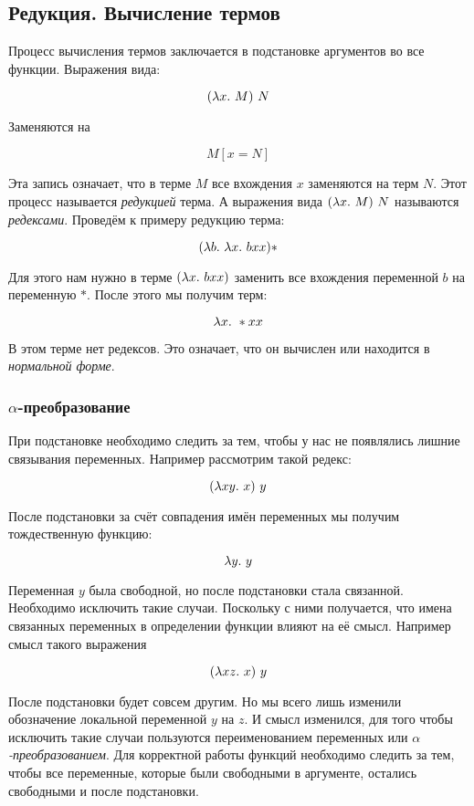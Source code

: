 \subsection{Редукция. Вычисление термов}

Процесс вычисления термов заключается в подстановке аргументов
во все функции. Выражения вида:

\[ (\lambda x .\  M)\ N \]

Заменяются на 

\[ M[x = N] \]

Эта запись означает, что в терме $M$ все вхождения $x$ 
заменяются на терм $N$. Этот процесс называется \emph{редукцией}
терма. А выражения вида $(\lambda x .\  M)\ N$ называются
\emph{редексами}. Проведём к примеру редукцию терма:

\[  (\lambda b.\  \lambda x.\  b xx) * \]

Для этого нам нужно в терме $(\lambda x.\  b xx)$ заменить все 
вхождения переменной $b$ на переменную $*$. После этого мы получим
терм:

\[ \lambda x .\  * xx \]

В этом терме нет редексов. Это означает, что он вычислен
или находится в \emph{нормальной форме}.

\subsubsection{$\alpha$-преобразование}

При подстановке необходимо следить за тем, чтобы у нас 
не появлялись лишние связывания переменных. Например 
рассмотрим такой редекс:

\[ (\lambda x y .\  x)\ y \]

После подстановки за счёт совпадения имён переменных 
мы получим тождественную функцию:

\[ \lambda y .\  y \]

Переменная $y$ была свободной, но после подстановки 
стала связанной. Необходимо исключить такие случаи.
Поскольку с ними получается, что имена связанных переменных 
в определении функции влияют на её смысл. Например смысл
такого выражения

\[ (\lambda x z .\  x)\ y \]

После подстановки будет совсем другим. Но мы всего лишь
изменили обозначение локальной переменной $y$ на $z$.
И смысл изменился, для того чтобы исключить такие случаи
пользуются переименованием переменных или 
\emph{$\alpha$-преобразованием}. Для корректной работы
функций необходимо следить за тем, чтобы все переменные,
которые были свободными в аргументе, остались свободными
и после подстановки.
    

